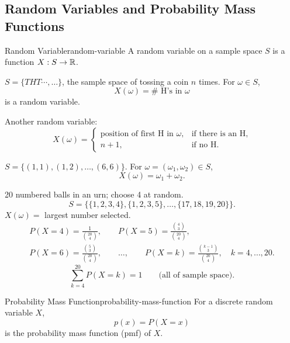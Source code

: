 \subsection{Random Variables and Probability Mass Functions}

\begin{definition}{Random Variable}{random-variable}
  A random variable on a sample space $S$ is a function $X:S\to\mathbb{R}$.
\end{definition}

\begin{example}
  $S=\{THT\cdots,\ldots\}$, the sample space of tossing a coin $n$ times.
  For $\omega\in S$,
  \[
    X(\omega)=\#\text{ H's in }\omega
  \]
  is a random variable.

  Another random variable:
  \[
    X(\omega)=
    \begin{cases}
      \text{position of first H in }\omega, & \text{if there is an H}, \\
      n+1,                                  & \text{if no H}.
    \end{cases}
  \]
\end{example}

\begin{example}
  $S=\{(1,1),(1,2),\ldots,(6,6)\}$.
  For $\omega=(\omega_1,\omega_2)\in S$,
  \[
    X(\omega)=\omega_1+\omega_2.
  \]
\end{example}

\begin{example}
  20 numbered balls in an urn; choose 4 at random.
  \[
    S=\bigl\{\{1,2,3,4\},\{1,2,3,5\},\ldots,\{17,18,19,20\}\bigr\}.
  \]
  $X(\omega)=$ largest number selected.
  \begin{gather*}
    P(X=4)=\frac1{\binom{20}{4}},\qquad
    P(X=5)=\frac{\binom43}{\binom{20}{4}},\\
    P(X=6)=\frac{\binom53}{\binom{20}{4}},\qquad\ldots,\qquad
    P(X=k)=\frac{\binom{k-1}{3}}{\binom{20}{4}},\quad k=4,\ldots,20.
  \end{gather*}
  \[
    \sum_{k=4}^{20}P(X=k)=1\qquad\text{(all of sample space)}.
  \]
\end{example}

\begin{definition}{Probability Mass Function}{probability-mass-function}
  For a discrete random variable $X$,
  \[
    p(x)=P(X=x)
  \]
  is the probability mass function (pmf) of $X$.
\end{definition}

